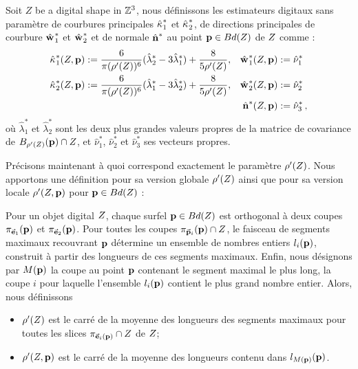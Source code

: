 \begin{definition}
  Soit $Z$ be a digital shape in $\mathbb{Z}^3$, nous définissons les estimateurs
  digitaux sans paramètre de courbures principales $\hat{\kappa_{}}_{1}^{*}$ et
  $\hat{\kappa_{}}_{2}^{*}$, de directions principales de courbure $\hat{\mathbf{w}_{}}_{1}^{*}$ et
  $\hat{\mathbf{w}_{}}_{2}^{*}$ et de normale $\hat{\mathbf{n}{}}^{*}$ au point $\mathbf{p} \in
  Bd({Z})$ de $Z$ comme :
  \begin{align}
      \hat{\kappa_{}}_{1}^{*}(Z, \mathbf{p})  &:= \frac{6}{\pi (\rho'(Z))^6}(\hat{\lambda}^{*}_2 - 3\hat{\lambda}^{*}_1) + \frac{8}{5 \rho'(Z)},
      &\hat{\mathbf{w}_{}}_{1}^{*}(Z, \mathbf{p}) &:= \hat{\nu}^{*}_1 \\
      \hat{\kappa_{}}_{2}^{*}(Z, \mathbf{p}) &:= \frac{6}{\pi (\rho'(Z))^6}(\hat{\lambda}^{*}_1 - 3\hat{\lambda}^{*}_2) + \frac{8}{5 \rho'(Z)},
      &\hat{\mathbf{w}_{}}_{2}^{*}(Z, \mathbf{p}) &:= \hat{\nu}^{*}_2\\
      & &\hat{\mathbf{n}{}}^{*}(Z, \mathbf{p}) &:=\hat{\nu}^{*}_3\,,
  \end{align}
  où $\hat{\lambda}^{*}_1$ et $\hat{\lambda}^{*}_2$ sont les deux plus grandes
  valeurs propres de la matrice de covariance de $B_{{\rho'(Z)}}(\mathbf{p})
  \cap Z$, et $ \hat{\nu}^{*}_1$, $\hat{\nu}^{*}_2$ et $\hat{\nu}^{*}_3$
  ses vecteurs propres.
  \label{def:curvature-estimator-3d-k1k2-pf}
\end{definition}
%
Précisons maintenant à quoi correspond exactement le paramètre
$\rho'(Z)$. Nous apportons une définition pour sa version globale
$\rho'(Z)$ ainsi que pour sa version locale $\rho'(Z, \mathbf{p})$ pour
$\mathbf{p} \in Bd({Z})$ :
%
\begin{definition}
  Pour un objet digital $Z$, chaque surfel $\mathbf{p} \in Bd({Z})$ est
  orthogonal à deux coupes $\pi_{\vec{\mathbf{e}}_1}(\mathbf{p})$ et $\pi_{\vec{\mathbf{e}}_2}(\mathbf{p})$.
  Pour toutes les coupes $\pi_{\vec{\mathbf{p}}_i}(\mathbf{p}) \cap Z$, le faisceau de
  segments maximaux recouvrant $\mathbf{p}$ détermine un ensemble de nombres entiers
  $l_i(\mathbf{p})$, construit à partir des longueurs de ces segments maximaux. Enfin,
  nous désignons par $M(\mathbf{p})$ la coupe au point $\mathbf{p}$ contenant le segment
  maximal le plus long, \cad la coupe $i$ pour laquelle l'ensemble $l_i(\mathbf{p})$
  contient le plus grand nombre entier. Alors, nous définissons
  \begin{itemize}
    \item $\rho'(Z)$ est le carré de la moyenne des longueurs des segments maximaux pour toutes les slices $\pi_{\vec{\mathbf{e}}_i(\mathbf{p})} \cap Z$ de $Z$;
    \item $\rho'(Z, \mathbf{p})$ est le carré de la moyenne des longueurs contenu dans $l_{M(\mathbf{p})}(\mathbf{p})$.
  \end{itemize}
\end{definition}
